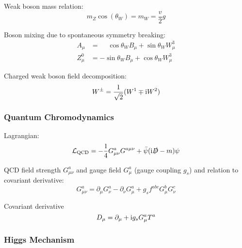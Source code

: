 			\noindent
			Weak boson mass relation:
			\begin{equation}
				m_Z \cos(\theta_W) = m_W = \frac{v}{2} g
			\end{equation}

			\noindent
			Boson mixing due to spontaneous symmetry breaking:
			\begin{align}
				A_\mu &= \phantom{-}\cos\theta_W B_\mu + \sin\theta_W W^3_\mu \\
				Z^0_\mu &= -\sin\theta_W B_\mu + \cos\theta_W W^3_\mu
			\end{align}

			\noindent
			Charged weak boson field decomposition:
			\begin{equation}
				W^\pm = \frac{1}{\sqrt{2}}(W^1 \mp \mathrm{i} W^2) \\
			\end{equation}


		\subsubsection{Quantum Chromodynamics}
			Lagrangian:
			\begin{equation}
				\mathcal{L}_\text{QCD} = -\frac{1}{4} G^a_{\mu\nu} G^{a\mu\nu} + \bar{\psi}(\mathrm{i}\slashed{D}-m)\psi
			\end{equation}

			\noindent
			QCD field strength $G^a_{\mu\nu}$ and gauge field $G^a_\mu$ (gauge coupling $g_s$) and relation to covariant derivative:
			\begin{equation}
				G^a_{\mu\nu} = \partial_\mu G^a_\nu - \partial_\nu G^a_\mu + g_s f^{abc} G^b_\mu G^c_\nu
			\end{equation}

			\noindent
			Covariant derivative
			\begin{equation}
				D_\mu = \partial_\mu + \mathrm{i} g_s G^a_\mu T^a
			\end{equation}



		\subsubsection{Higgs Mechanism}



